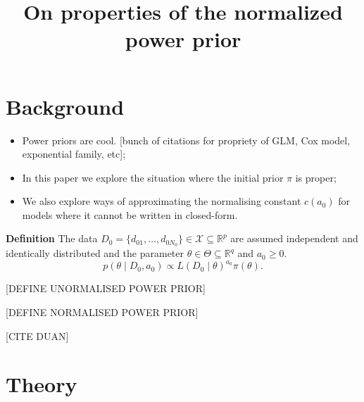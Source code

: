 \documentclass[a4paper, notitlepage, 11pt]{article}
\title{\vspace{-9ex}\centering \bf On properties of the normalized power prior}
\author{
}
\begin{document}
\maketitle

% 

\section{Background}

\begin{itemize}
 \item Power priors are cool. [bunch of citations for propriety of GLM, Cox model, exponential family, etc];
 \item In this paper we explore the situation where the initial prior $\pi$ is proper;
 \item We also explore ways of approximating the normalising constant $c(a_0)$ for models where it cannot be written in closed-form. 
\end{itemize}

\textbf{Definition}
The data $D_0 = \{ d_{01}, \ldots, d_{0N_0} \} \in \mathcal{X} \subseteq \mathbb{R}^p$ are assumed independent and identically distributed  and the parameter $\theta \in \Theta \subseteq \mathbb{R}^q$ and $a_0 \geq 0$.
\begin{equation}
\label{eq:power_prior}
 p(\theta \mid D_0, a_0) \propto L(D_0 \mid \theta)^{a_0}\pi(\theta).
\end{equation}

[DEFINE UNORMALISED POWER PRIOR]

[DEFINE NORMALISED POWER PRIOR]

[CITE DUAN] 

\section{Theory}
\end{document}
